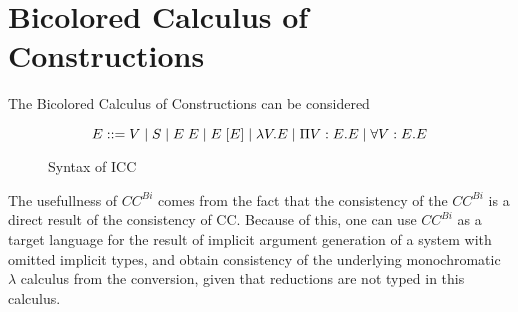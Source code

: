 \section{Bicolored Calculus of Constructions}

The Bicolored Calculus of Constructions \citep{luther2001more}
can be considered 
\begin{figure}[h]
\[ 
E ::= V 
 \; | \; S 
 \; | \; E\;E 
 \; | \; E\;[E]
 \; | \; \lambda V . E 
 \; | \; \Pi V : E . E 
 \; | \; \forall V : E . E 
\]
\caption{Syntax of ICC}
\label{icc:syntax}
\end{figure}

The usefullness of $CC^{Bi}$ comes from the fact that the
consistency of the $CC^{Bi}$ is a direct result of the consistency of CC.
Because of this, one can use $CC^{Bi}$ as a target language for the result of implicit argument 
generation of a system with omitted implicit types, and obtain consistency of 
the underlying monochromatic $\lambda$ calculus from the conversion,
given that reductions are not typed in this calculus.

